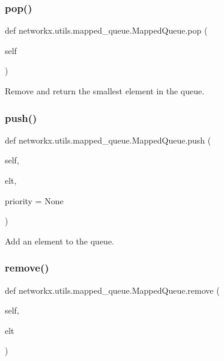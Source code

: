 \subsubsection{\texorpdfstring{pop()}{pop()}}
{\footnotesize\ttfamily def networkx.\+utils.\+mapped\+\_\+queue.\+Mapped\+Queue.\+pop (\begin{DoxyParamCaption}\item[{}]{self }\end{DoxyParamCaption})}

\begin{DoxyVerb}Remove and return the smallest element in the queue.\end{DoxyVerb}
 \mbox{\label{classnetworkx_1_1utils_1_1mapped__queue_1_1MappedQueue_a33447b47368614cd50a5a7ef012b8193}} 
\subsubsection{\texorpdfstring{push()}{push()}}
{\footnotesize\ttfamily def networkx.\+utils.\+mapped\+\_\+queue.\+Mapped\+Queue.\+push (\begin{DoxyParamCaption}\item[{}]{self,  }\item[{}]{elt,  }\item[{}]{priority = {\ttfamily None} }\end{DoxyParamCaption})}

\begin{DoxyVerb}Add an element to the queue.\end{DoxyVerb}
 \mbox{\label{classnetworkx_1_1utils_1_1mapped__queue_1_1MappedQueue_a3ef740aed764281890fb279c9ee94319}} 
\subsubsection{\texorpdfstring{remove()}{remove()}}
{\footnotesize\ttfamily def networkx.\+utils.\+mapped\+\_\+queue.\+Mapped\+Queue.\+remove (\begin{DoxyParamCaption}\item[{}]{self,  }\item[{}]{elt }\end{DoxyParamCaption})}

